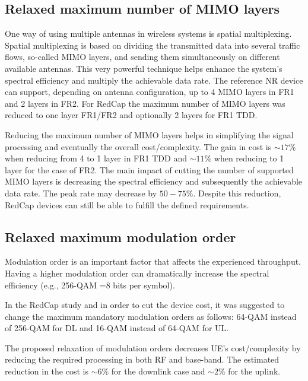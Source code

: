 \documentclass[]{IEEEtran}
\begin{document}
\subsection{Relaxed maximum number of MIMO layers}
\label{sec:4-4}

One way of using multiple antennas in wireless systems is spatial multiplexing. Spatial multiplexing is based on dividing the transmitted data into several traffic flows, so-called MIMO layers, and sending them simultaneously on different available antennas. This very powerful technique helps enhance the system's spectral efficiency and multiply the achievable data rate.
The reference NR device can support, depending on antenna configuration, up to 4 MIMO layers in FR1 and 2 layers in FR2.
For RedCap the maximum number of MIMO layers was reduced to one layer FR1/FR2 and optionally 2 layers for FR1 TDD.

Reducing the maximum number of MIMO layers helps in simplifying the signal processing and eventually the overall cost/complexity. The gain in cost is $\sim17\%$ when reducing from 4 to 1 layer in FR1 TDD and $\sim11\%$ when reducing to 1 layer for the case of FR2.
The main impact of cutting the number of supported MIMO layers is decreasing the spectral efficiency and subsequently the achievable data rate. The peak rate may decrease by $50-75\%$. Despite this reduction, RedCap devices can still be able to fulfill the defined requirements.

\subsection{Relaxed maximum modulation order}
\label{sec:4-5}

Modulation order is an important factor that affects the experienced throughput. Having a higher modulation order can dramatically increase the spectral efficiency (e.g., 256-QAM =8  bits per symbol).

In the RedCap study and in order to cut the device cost, it was suggested to change the maximum mandatory modulation orders as follows: 64-QAM instead of 256-QAM for DL  and 16-QAM instead of 64-QAM for UL.

The proposed relaxation of modulation orders decreases UE's cost/complexity by reducing the required processing in both RF and base-band. The estimated reduction in the cost is $\sim6\%$ for the downlink case and $\sim2\%$ for the uplink.
\end{document}
